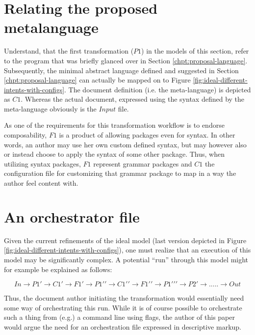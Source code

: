 \documentclass{scrreprt}
\begin{document}
\section{Relating the proposed metalanguage}
Understand, that the first transformation ($P1$) in the models of this section, refer to the program that was briefly glanced over in Section \ref{chpt:proposal-language}. Subsequently, the minimal abstract language defined and suggested in Section \ref{chpt:proposal-language} can actually be mapped on to Figure \ref{fig:ideal-different-intents-with-configs}. The document definition (i.e. the meta-language) is depicted as $C1$. Whereas the actual document, expressed using the syntax defined by the meta-language obviously is the $Input$ file.

As one of the requirements for this transformation workflow is to endorse composability, $F1$ is a product of allowing packages even for syntax. In other words, an author may use her own custom defined syntax, but may however also or instead choose to apply the syntax of some other package. Thus, when utilizing syntax packages, $F1$ represent grammar packages and $C1$ the configuration file for customizing that grammar package to map in a way the author feel content with.





\section{An orchestrator file}
Given the current refinements of the ideal model (last version depicted in Figure \ref{fig:ideal-different-intents-with-configs}), one must realize that an execution of this model may be significantly complex. A potential ``run'' through this model might for example be explained as follows:

$$
In \to
P1\prime \to
C1\prime \to
F1\prime \to
P1\prime\prime \to
C1\prime\prime \to
F1\prime\prime \to
P1\prime\prime\prime \to
P2\prime \to
..... \to Out
$$

Thus, the document author initiating the transformation would essentially need some way of orchestrating this run. While it is of course possible to orchestrate such a thing from (e.g.) a command line using flags, the author of this paper would argue the need for an orchestration file expressed in descriptive markup.
\end{document}
